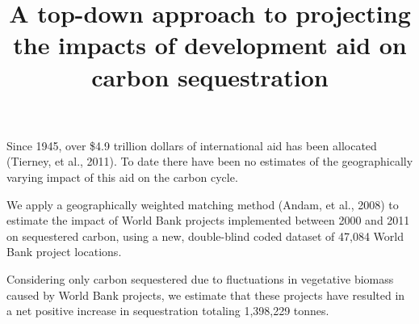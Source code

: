 \documentclass{article}\usepackage[]{graphicx}\usepackage[]{color}
\title{A top-down approach to projecting the impacts of development aid on carbon sequestration}
\makeatletter
\newenvironment{knitrout}{}{}  %
\newcommand\gobblepars{%
    \@ifnextchar\par%
        {\expandafter\gobblepars\@gobble}%
        {}}
\makeatother
\begin{document}
\begin{knitrout}







  Since 1945, over \$4.9 trillion dollars of international aid has been allocated (Tierney, et al., 2011).
 To date there have been no estimates of the geographically varying impact of this aid on the carbon cycle.  \gobblepars


  We apply a geographically weighted matching method (Andam, et al., 2008) to estimate the impact of World Bank projects implemented between 2000 and 2011 on sequestered carbon, using a new, double-blind coded dataset of 47,084 World Bank project locations.\gobblepars

 Considering only carbon sequestered due to fluctuations in vegetative biomass caused by World Bank projects, we estimate that these projects have resulted in a net positive increase in sequestration totaling 1,398,229 tonnes.\gobblepars








\end{knitrout}
\end{document}
